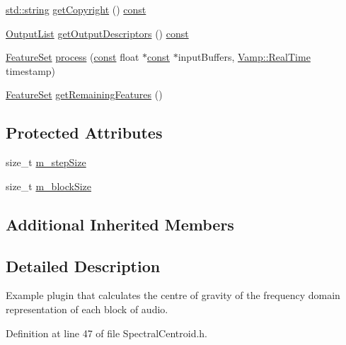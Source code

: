 \begin{DoxyCompactItemize}
\item 
\hyperlink{test__lib_f_l_a_c_2format_8c_ab02026ad0de9fb6c1b4233deb0a00c75}{std\+::string} \hyperlink{class_spectral_centroid_a925747d513d598e0fa21ed0ed6520980}{get\+Copyright} () \hyperlink{getopt1_8c_a2c212835823e3c54a8ab6d95c652660e}{const} 
\item 
\hyperlink{class_vamp_1_1_plugin_a30f531b8fb69fac41a24e3d2a6a08ed9}{Output\+List} \hyperlink{class_spectral_centroid_a894ca9740927102bb80b56b5e9e95877}{get\+Output\+Descriptors} () \hyperlink{getopt1_8c_a2c212835823e3c54a8ab6d95c652660e}{const} 
\item 
\hyperlink{class_vamp_1_1_plugin_a448fb57dc245d47923ec9eeaf9856c5f}{Feature\+Set} \hyperlink{class_spectral_centroid_aca96c70e7e75c9e4a7db38485018914c}{process} (\hyperlink{getopt1_8c_a2c212835823e3c54a8ab6d95c652660e}{const} float $\ast$\hyperlink{getopt1_8c_a2c212835823e3c54a8ab6d95c652660e}{const} $\ast$input\+Buffers, \hyperlink{struct_vamp_1_1_real_time}{Vamp\+::\+Real\+Time} timestamp)
\item 
\hyperlink{class_vamp_1_1_plugin_a448fb57dc245d47923ec9eeaf9856c5f}{Feature\+Set} \hyperlink{class_spectral_centroid_a83ba39f0870a2f86837605a958dfab1a}{get\+Remaining\+Features} ()
\end{DoxyCompactItemize}
\subsection*{Protected Attributes}
\begin{DoxyCompactItemize}
\item 
size\+\_\+t \hyperlink{class_spectral_centroid_a49805a090ba58477da4adbefea4392a7}{m\+\_\+step\+Size}
\item 
size\+\_\+t \hyperlink{class_spectral_centroid_a262f583d71b442bb2d80023e7c85aa4e}{m\+\_\+block\+Size}
\end{DoxyCompactItemize}
\subsection*{Additional Inherited Members}


\subsection{Detailed Description}
Example plugin that calculates the centre of gravity of the frequency domain representation of each block of audio. 

Definition at line 47 of file Spectral\+Centroid.\+h.



